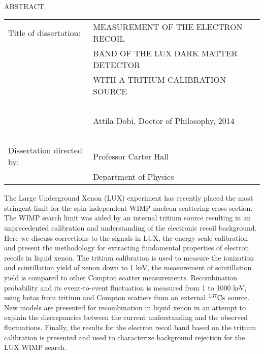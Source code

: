 
\hbox{\ }

\renewcommand{\baselinestretch}{1}
\small \normalsize

\begin{center}
\large{{ABSTRACT}} 

\vspace{3em} 

\end{center}
\hspace{-.15in}
\begin{tabular}{ll}
Title of dissertation:    & {\large  MEASUREMENT OF THE ELECTRON RECOIL}\\
&				      {\large  BAND OF THE LUX DARK MATTER DETECTOR} \\
&				      {\large  WITH A TRITIUM CALIBRATION SOURCE} \\

\ \\
&                          {\large  Attila Dobi, Doctor of Philosophy, 2014} \\
\ \\
Dissertation directed by: & {\large  Professor Carter Hall} \\
&  				{\large	 Department of Physics } \\
\end{tabular}

\vspace{3em}

\renewcommand{\baselinestretch}{2}
\large \normalsize

The Large Underground Xenon (LUX) experiment has recently placed the most stringent limit for the spin-independent WIMP-nucleon scattering cross-section. The WIMP search limit was aided by an internal tritium source resulting in an unprecedented calibration and understanding of the electronic recoil background. Here we discuss corrections to the signals in LUX, the energy scale calibration and present the methodology for extracting fundamental properties of electron recoils in liquid xenon. The tritium calibration is used to measure the ionization and scintillation yield of xenon down to 1 keV, the measurement of scintillation yield is compared to other Compton scatter measurements.  Recombination probability and its event-to-event fluctuation is measured from 1 to 1000 keV, using betas from tritium and Compton scatters from an external $\rm ^{137}Cs$ source. New models are presented for recombination in liquid xenon in an attempt to explain the discrepancies between the current understanding and the observed fluctuations. Finally, the results for the electron recoil band based on the tritium calibration is presented and used to characterize background rejection for the LUX WIMP search.
